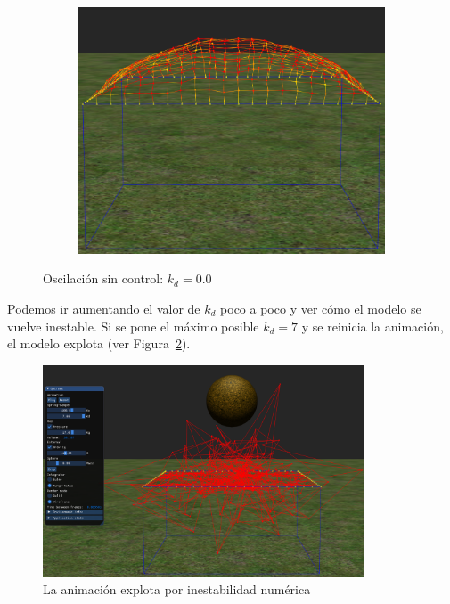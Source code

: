 \begin{figure}
\begin{subfigure}[b]{0.30\textwidth}
  \end{subfigure}
~
  \begin{subfigure}[b]{0.30\textwidth}
    \includegraphics[width=\textwidth]{img/04/noDamp3}
  \end{subfigure}
 \caption[Experimento: Quitar la fuerza del amortiguador]{Oscilación sin control: $k_d=0.0$} 
 \label{res:test1}
\end{figure}

Podemos ir aumentando el valor de $k_d$ poco a poco y ver cómo el modelo se vuelve inestable. 
Si se pone el máximo posible $k_d=7$ y se reinicia la animación, el modelo explota (ver Figura~\ref{res:test4}).

\begin{figure}
 \centering
 \includegraphics[width=0.85\textwidth]{img/04/maxDamp}
 \caption[Explosión por inestabilidad numérica]{La animación explota por inestabilidad numérica}
 \label{res:test4}
\end{figure}

